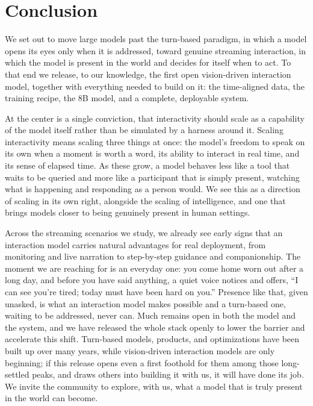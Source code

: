 \documentclass{llmxive}
\begin{document}
\section{Conclusion}\label{sec:conclusion}
We set out to move large models past the turn-based paradigm, in which a model opens its eyes only when it is addressed, toward genuine streaming interaction, in which the model is present in the world and decides for itself when to act. To that end we release, to our knowledge, the first open vision-driven interaction model, together with everything needed to build on it: the time-aligned data, the training recipe, the 8B model, and a complete, deployable system.

At the center is a single conviction, that interactivity should scale as a capability of the model itself rather than be simulated by a harness around it. Scaling interactivity means scaling three things at once: the model's freedom to speak on its own when a moment is worth a word, its ability to interact in real time, and its sense of elapsed time. As these grow, a model behaves less like a tool that waits to be queried and more like a participant that is simply present, watching what is happening and responding as a person would. We see this as a direction of scaling in its own right, alongside the scaling of intelligence, and one that brings models closer to being genuinely present in human settings.

Across the streaming scenarios we study, we already see early signs that an interaction model carries natural advantages for real deployment, from monitoring and live narration to step-by-step guidance and companionship. The moment we are reaching for is an everyday one: you come home worn out after a long day, and before you have said anything, a quiet voice notices and offers, ``I can see you're tired; today must have been hard on you.'' Presence like that, given unasked, is what an interaction model makes possible and a turn-based one, waiting to be addressed, never can. Much remains open in both the model and the system, and we have released the whole stack openly to lower the barrier and accelerate this shift. Turn-based models, products, and optimizations have been built up over many years, while vision-driven interaction models are only beginning; if this release opens even a first foothold for them among those long-settled peaks, and draws others into building it with us, it will have done its job. We invite the community to explore, with us, what a model that is truly present in the world can become. 
\end{document}
